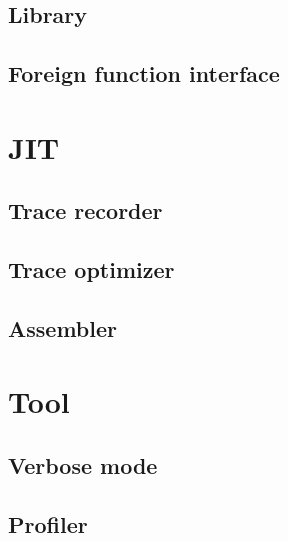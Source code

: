 \documentclass[12pt, oneside]{Thesis}
\begin{document}
    \section{Library}
    \label{Sec:Library}
    

    \section{Foreign function interface}
    \label{Sec:FFI}
    

  \chapter{JIT}
  \label{Chapt:JIT}

    \section{Trace recorder}
    \label{Sec:TR}
    

    \section{Trace optimizer}
    \label{Sec:TO}
    

    \section{Assembler}
    \label{Sec:TA}
    

  \chapter{Tool}
  \label{Chapt:Tool}
  

    \section{Verbose mode}
    \label{Sec:Verbose}
    

    \section{Profiler}
    \label{Sec:Profiler}
    
\end{document}
